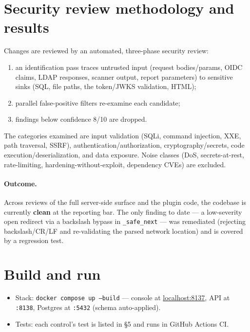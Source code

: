 \documentclass[11pt,a4paper]{article}
\newcommand{\code}[1]{\texttt{#1}}
\begin{document}
\section{Security review methodology and results}
Changes are reviewed by an automated, three-phase security review:
\begin{enumerate}
  \item an identification pass traces untrusted input (request bodies/params,
        OIDC claims, LDAP responses, scanner output, report parameters) to
        sensitive sinks (SQL, file paths, the token/JWKS validation, HTML);
  \item parallel false-positive filters re-examine each candidate;
  \item findings below confidence 8/10 are dropped.
\end{enumerate}
The categories examined are input validation (SQLi, command injection, XXE, path
traversal, SSRF), authentication/authorization, cryptography/secrets, code
execution/deserialization, and data exposure. Noise classes (DoS, secrets-at-rest,
rate-limiting, hardening-without-exploit, dependency CVEs) are excluded.

\paragraph{Outcome.} Across reviews of the full server-side surface and the plugin
code, the codebase is currently \textbf{clean} at the reporting bar. The only
finding to date --- a low-severity open redirect via a backslash bypass in
\code{\_safe\_next} --- was remediated (rejecting backslash/CR/LF and re-validating
the parsed network location) and is covered by a regression test.

\appendix
\section{Build and run}
\begin{itemize}
  \item Stack: \code{docker compose up --build} --- console at
        \href{http://localhost:8137}{localhost:8137}, API at \code{:8138},
        Postgres at \code{:5432} (schema auto-applied).
  \item Tests: each control's test is listed in \S5 and runs in GitHub Actions CI.
\end{itemize}
\end{document}
